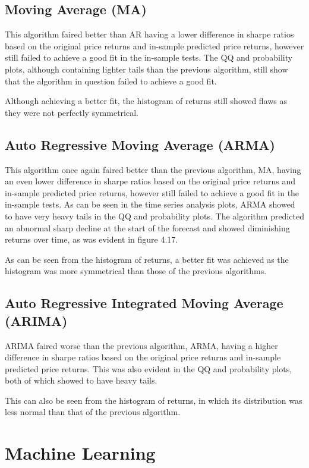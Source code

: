 \subsection{Moving Average (MA)}
This algorithm faired better than AR having a lower difference in sharpe ratios based on the original price returns and in-sample predicted price returns, however still failed to achieve a good fit in the in-sample tests. The QQ and probability plots, although containing lighter tails than the previous algorithm, still show that the algorithm in question failed to achieve a good fit.

Although achieving a better fit, the histogram of returns still showed flaws as they were not perfectly symmetrical.

\subsection{Auto Regressive Moving Average (ARMA)}
This algorithm once again faired better than the previous algorithm, MA, having an even lower difference in sharpe ratios based on the original price returns and in-sample predicted price returns, however still failed to achieve a good fit in the in-sample tests. As can be seen in the time series analysis plots, ARMA showed to have very heavy tails in the QQ and probability plots. The algorithm predicted an abnormal sharp decline at the start of the forecast and showed diminishing returns over time, as was evident in figure 4.17.

As can be seen from the histogram of returns, a better fit was achieved as the histogram was more symmetrical than those of the previous algorithms.

\subsection{Auto Regressive Integrated Moving Average (ARIMA)}
ARIMA faired worse than the previous algorithm, ARMA, having a higher difference in sharpe ratios based on the original price returns and in-sample predicted price returns. This was also evident in the QQ and probability plots, both of which showed to have heavy tails.

This can also be seen from the histogram of returns, in which its distribution was less normal than that of the previous algorithm.

\section{Machine Learning}

